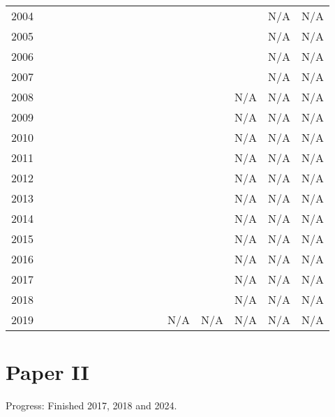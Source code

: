 \begin{center}
\begin{tabular}{c|cccccccccccccccc}
        2004 &   &   &   &   &   &   &   &   &   &    &    &     &     &     & N/A & N/A \\
        2005 &   &   &   &   &   &   &   &   &   &    &    &     &     &     & N/A & N/A \\
        2006 &   &   &   &   &   &   &   &   &   &    &    &     &     &     & N/A & N/A \\
        2007 &   &   &   &   &   &   &   &   &   &    &    &     &     &     & N/A & N/A \\
        2008 &   &   &   &   &   &   &   &   &   &    &    &     &     & N/A & N/A & N/A \\
        2009 &   &   &   &   &   &   &   &   &   &    &    &     &     & N/A & N/A & N/A \\
        2010 &   &   &   &   &   &   &   &   &   &    &    &     &     & N/A & N/A & N/A \\
        2011 &   &   &   &   &   &   &   &   &   &    &    &     &     & N/A & N/A & N/A \\
        2012 &   &   &   &   &   &   &   &   &   &    &    &     &     & N/A & N/A & N/A \\
        2013 &   &   &   &   &   &   &   &   &   &    &    &     &     & N/A & N/A & N/A \\
        2014 &   &   &   &   &   &   &   &   &   &    &    &     &     & N/A & N/A & N/A \\
        2015 &   &   &   &   &   &   &   &   &   &    &    &     &     & N/A & N/A & N/A \\
        2016 &   &   &   &   &   &   &   &   &   &    &    &     &     & N/A & N/A & N/A \\
        2017 &   &   &   &   &   &   &   &   &   &    &    &     &     & N/A & N/A & N/A \\
        2018 &   &   &   &   &   &   &   &   &   &    &    &     &     & N/A & N/A & N/A \\
        2019 &   &   &   &   &   &   &   &   &   &    &    & N/A & N/A & N/A & N/A & N/A
    \end{tabular}
\end{center}

\clearpage
\section*{Paper II}
Progress: Finished 2017, 2018 and 2024.

